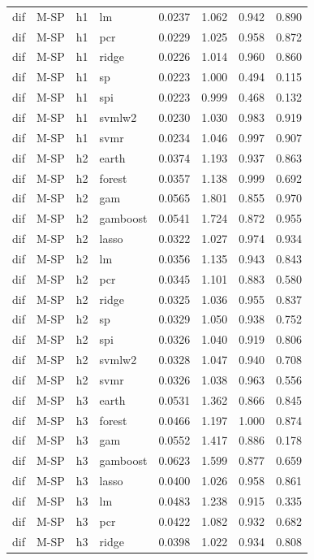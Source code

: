\begin{ThreePartTable}
\begin{longtable}[t]{llclcccc}
dif & M-SP & h1 & lm & 0.0237 & 1.062 & 0.942 & 0.890\\
dif & M-SP & h1 & pcr & 0.0229 & 1.025 & 0.958 & 0.872\\
dif & M-SP & h1 & ridge & 0.0226 & 1.014 & 0.960 & 0.860\\
dif & M-SP & h1 & sp & 0.0223 & 1.000 & 0.494 & 0.115\\
dif & M-SP & h1 & spi & 0.0223 & 0.999 & 0.468 & 0.132\\
dif & M-SP & h1 & svmlw2 & 0.0230 & 1.030 & 0.983 & 0.919\\
dif & M-SP & h1 & svmr & 0.0234 & 1.046 & 0.997 & 0.907\\
\addlinespace
dif & M-SP & h2 & earth & 0.0374 & 1.193 & 0.937 & 0.863\\
dif & M-SP & h2 & forest & 0.0357 & 1.138 & 0.999 & 0.692\\
dif & M-SP & h2 & gam & 0.0565 & 1.801 & 0.855 & 0.970\\
dif & M-SP & h2 & gamboost & 0.0541 & 1.724 & 0.872 & 0.955\\
dif & M-SP & h2 & lasso & 0.0322 & 1.027 & 0.974 & 0.934\\
dif & M-SP & h2 & lm & 0.0356 & 1.135 & 0.943 & 0.843\\
dif & M-SP & h2 & pcr & 0.0345 & 1.101 & 0.883 & 0.580\\
dif & M-SP & h2 & ridge & 0.0325 & 1.036 & 0.955 & 0.837\\
dif & M-SP & h2 & sp & 0.0329 & 1.050 & 0.938 & 0.752\\
dif & M-SP & h2 & spi & 0.0326 & 1.040 & 0.919 & 0.806\\
dif & M-SP & h2 & svmlw2 & 0.0328 & 1.047 & 0.940 & 0.708\\
dif & M-SP & h2 & svmr & 0.0326 & 1.038 & 0.963 & 0.556\\
\addlinespace
dif & M-SP & h3 & earth & 0.0531 & 1.362 & 0.866 & 0.845\\
dif & M-SP & h3 & forest & 0.0466 & 1.197 & 1.000 & 0.874\\
dif & M-SP & h3 & gam & 0.0552 & 1.417 & 0.886 & 0.178\\
dif & M-SP & h3 & gamboost & 0.0623 & 1.599 & 0.877 & 0.659\\
dif & M-SP & h3 & lasso & 0.0400 & 1.026 & 0.958 & 0.861\\
dif & M-SP & h3 & lm & 0.0483 & 1.238 & 0.915 & 0.335\\
dif & M-SP & h3 & pcr & 0.0422 & 1.082 & 0.932 & 0.682\\
dif & M-SP & h3 & ridge & 0.0398 & 1.022 & 0.934 & 0.808\\

\end{longtable}
\end{ThreePartTable}

